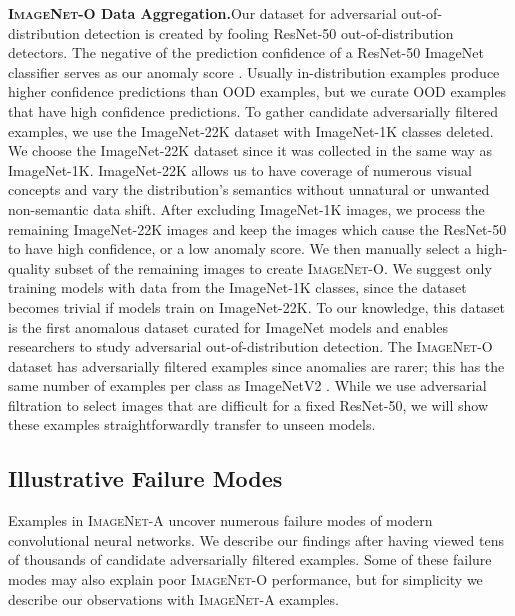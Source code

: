 \documentclass[10pt,twocolumn,letterpaper]{article}
\begin{document}
\noindent\textbf{\textsc{ImageNet-O} Data Aggregation.}\quad Our dataset for adversarial out-of-distribution detection is created by fooling ResNet-50 out-of-distribution detectors. The negative of the prediction confidence of a ResNet-50 ImageNet classifier serves as our anomaly score \cite{hendrycks17baseline}. Usually in-distribution examples produce higher confidence predictions than OOD examples, but we curate OOD examples that have high confidence predictions. To gather candidate adversarially filtered examples, we use the ImageNet-22K dataset with ImageNet-1K classes deleted. We choose the ImageNet-22K dataset since it was collected in the same way as ImageNet-1K. ImageNet-22K allows us to have coverage of numerous visual concepts and vary the distribution's semantics without unnatural or unwanted non-semantic data shift. After excluding ImageNet-1K images, we process the remaining ImageNet-22K images and keep the images which cause the ResNet-50 to have high confidence, or a low anomaly score. We then manually select a high-quality subset of the remaining images to create \textsc{ImageNet-O}. We suggest only training models with data from the  ImageNet-1K classes, since the dataset becomes trivial if models train on ImageNet-22K. To our knowledge, this dataset is the first anomalous dataset curated for ImageNet models and enables researchers to study adversarial out-of-distribution detection. The \textsc{ImageNet-O} dataset has  adversarially filtered examples since anomalies are rarer; this has the same number of examples per class as ImageNetV2 \cite{Recht2019DoIC}. While we use adversarial filtration to select images that are difficult for a fixed ResNet-50, we will show these examples straightforwardly transfer to unseen models. 


\subsection{Illustrative Failure Modes}\label{sec:failures}

Examples in \textsc{ImageNet-A} uncover numerous failure modes of modern convolutional neural networks. We describe our findings after having viewed tens of thousands of candidate adversarially filtered examples. Some of these failure modes may also explain poor \textsc{ImageNet-O} performance, but for simplicity we describe our observations with \textsc{ImageNet-A} examples.
\end{document}
